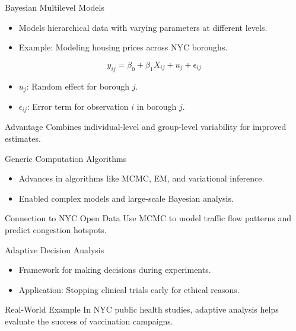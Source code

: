 \documentclass{beamer}
\begin{document}
\begin{frame}{Bayesian Multilevel Models}
\begin{itemize}
    \item Models hierarchical data with varying parameters at different levels.
    \item Example: Modeling housing prices across NYC boroughs.
\end{itemize}

\[
y_{ij} = \beta_0 + \beta_1 X_{ij} + u_j + \epsilon_{ij}
\]
\begin{itemize}
    \item \( u_j \): Random effect for borough \( j \).
    \item \( \epsilon_{ij} \): Error term for observation \( i \) in borough \( j \).
\end{itemize}

\begin{block}{Advantage}
Combines individual-level and group-level variability for improved estimates.
\end{block}
\end{frame}

\begin{frame}{Generic Computation Algorithms}
\begin{itemize}
    \item Advances in algorithms like MCMC, EM, and variational inference.
    \item Enabled complex models and large-scale Bayesian analysis.
\end{itemize}

\begin{block}{Connection to NYC Open Data}
Use MCMC to model traffic flow patterns and predict congestion hotspots.
\end{block}
\end{frame}

\begin{frame}{Adaptive Decision Analysis}
\begin{itemize}
    \item Framework for making decisions during experiments.
    \item Application: Stopping clinical trials early for ethical reasons.
\end{itemize}

\begin{block}{Real-World Example}
In NYC public health studies, adaptive analysis helps evaluate the success of vaccination campaigns.
\end{block}
\end{frame}
\end{document}
